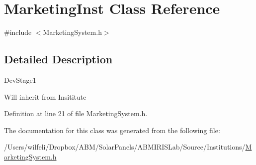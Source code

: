 \hypertarget{class_marketing_inst}{}\section{Marketing\+Inst Class Reference}
\label{class_marketing_inst}


{\ttfamily \#include $<$Marketing\+System.\+h$>$}



\subsection{Detailed Description}
\begin{DoxyRefDesc}{Dev\+Stage1}
\item[\hyperlink{_dev_stage1__DevStage1000001}{Dev\+Stage1}]Will inherit from Insititute\end{DoxyRefDesc}


Definition at line 21 of file Marketing\+System.\+h.



The documentation for this class was generated from the following file\+:\begin{DoxyCompactItemize}
\item 
/\+Users/wilfeli/\+Dropbox/\+A\+B\+M/\+Solar\+Panels/\+A\+B\+M\+I\+R\+I\+S\+Lab/\+Source/\+Institutions/\hyperlink{_marketing_system_8h}{Marketing\+System.\+h}\end{DoxyCompactItemize}
